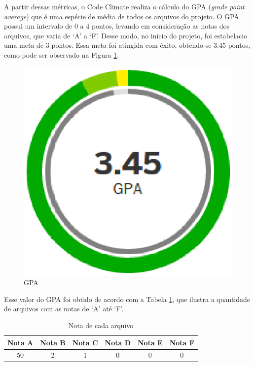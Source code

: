 \newpage

A partir dessas métricas, o Code Climate realiza o cálculo do GPA (\textit{grade point average}) que é uma espécie de média de todos os arquivos do projeto. O GPA possui um intervalo de 0 a 4 pontos, levando em consideração as notas dos arquivos, que varia de `A' a `F'. Desse modo, no início do projeto, foi estabelacio uma meta de 3 pontos. Essa meta foi atingida com êxito, obtendo-se 3.45 pontos, como pode ser observado na Figura \ref{GPA}.

\begin{figure}[!h]
	\centering
	\includegraphics[scale=0.5]{figuras/resultados/gpa.eps}
	\caption[GPA]{GPA}
	\label{GPA}
\end{figure}

Esse valor do GPA foi obtido de acordo com a Tabela \ref{gpa_arquivos}, que ilustra a quantidade de arquivos com as notas de `A' até `F'.

\begin{table}[!h]
\centering
\caption{Nota de cada arquivo}
\label{gpa_arquivos}
\begin{tabular}{cccccc}
\toprule
\textbf{Nota A} & \textbf{Nota B} & \textbf{Nota C} & \textbf{Nota D} & \textbf{Nota E} & \textbf{Nota F} \\ \midrule
50 & 2 & 1 & 0 & 0 & 0							   \\ \bottomrule
\end{tabular}
\end{table}

